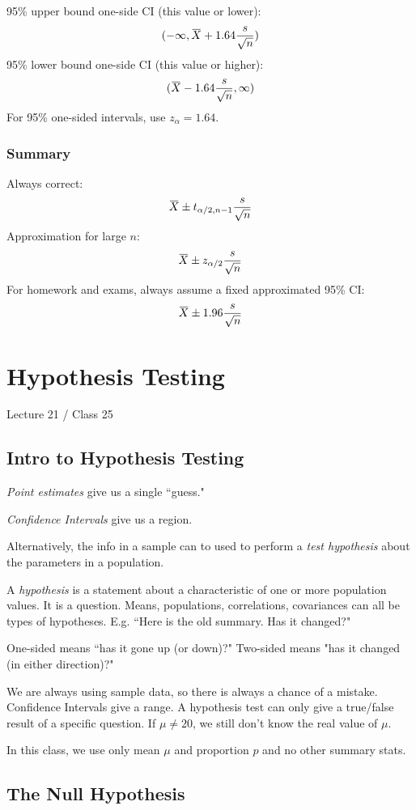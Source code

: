 \documentclass[11pt, oneside]{article}   	%
\newcommand{\overbar}[1]{\mkern 1.5mu\overline{\mkern-1.5mu#1\mkern-1.5mu}\mkern 1.5mu}
\begin{document}
95\% upper bound one-side CI (this value or lower):
\[
(-\infty, \overbar{X} + 1.64 \frac{s} {\sqrt{n}} )
\]
95\% lower bound one-side CI (this value or higher):
\[
(\overbar{X} - 1.64 \frac{s} {\sqrt{n}} , \infty)
\]
For 95\% one-sided intervals, use $z_{\alpha} = 1.64$.

\subsubsection{Summary}
Always correct:
\[
\overbar{X} \pm t_{\alpha / 2, n-1} \frac{s} {\sqrt{n}}
\]
Approximation for large $n$:
\[
\overbar{X} \pm z_{\alpha / 2} \frac{s} {\sqrt{n}}
\]
For homework and exams, always assume a fixed approximated 95\% CI:
\[
\overbar{X} \pm 1.96 \frac{s} {\sqrt{n}}
\]

\section{Hypothesis Testing}

Lecture 21 / Class 25
\subsection{Intro to Hypothesis Testing}

\textit{Point estimates} give us a single ``guess."

\textit{Confidence Intervals} give us a region.

Alternatively, the info in a sample can to used to perform a \textit{test hypothesis} about the parameters in a population.

A \textit{hypothesis} is a statement about a characteristic of one or more population values. It is a question. Means, populations, correlations, covariances can all be types of hypotheses. E.g. ``Here is the old summary. Has it changed?" 

One-sided means ``has it gone up (or down)?" Two-sided means "has it changed (in either direction)?"

We are always using sample data, so there is always a chance of a mistake. Confidence Intervals give a range. A hypothesis test can only give a true/false result of a specific question. If $\mu \neq 20$, we still don't know the real value of $\mu$.

In this class, we use only mean $\mu$ and proportion $p$ and no other summary stats.

\subsection{The Null Hypothesis}
\end{document}
